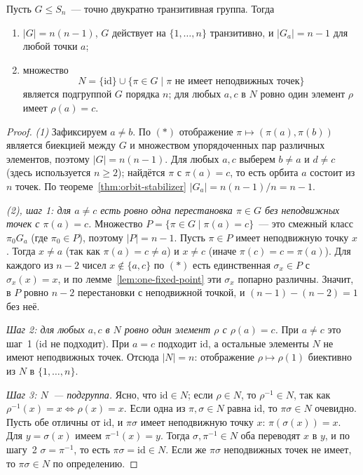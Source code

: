 \documentclass[12pt]{article}
\begin{document}
	\begin{theorem}\label{thm:sharply-2-transitive}
		Пусть $G \leqslant S_n$~--- точно двукратно транзитивная группа. Тогда
		\begin{enumerate}
			\item $|G| = n(n - 1)$, $G$ действует на $\{1, \dots, n\}$ транзитивно, и $|G_a| = n - 1$ для любой точки $a$;
			\item множество
			\[
				N = \{ \mathrm{id} \} \cup \{ \pi \in G \mid \pi \text{ не имеет неподвижных точек} \}
			\]
			является подгруппой $G$ порядка $n$; для любых $a, c$ в $N$ ровно один элемент $\rho$ имеет $\rho(a) = c$.
		\end{enumerate}
	\end{theorem}

	\begin{proof}
		\emph{(1)} Зафиксируем $a \ne b$. По $(\ast)$ отображение $\pi \mapsto (\pi(a), \pi(b))$ является биекцией между $G$ и множеством упорядоченных пар различных элементов, поэтому $|G| = n(n - 1)$. Для любых $a, c$ выберем $b \ne a$ и $d \ne c$ (здесь используется $n \geqslant 2$); найдётся $\pi$ с $\pi(a) = c$, то есть орбита $a$ состоит из $n$ точек. По теореме~\ref{thm:orbit-stabilizer} $|G_a| = n(n - 1)/n = n - 1$.

		\emph{(2), шаг 1: для $a \ne c$ есть ровно одна перестановка $\pi \in G$ без неподвижных точек с $\pi(a) = c$.}
		Множество $P = \{ \pi \in G \mid \pi(a) = c \}$~--- это смежный класс $\pi_0G_a$ (где $\pi_0 \in P$), поэтому $|P| = n - 1$. Пусть $\pi \in P$ имеет неподвижную точку $x$. Тогда $x \ne a$ (так как $\pi(a) = c \ne a$) и $x \ne c$ (иначе $\pi(c) = c = \pi(a)$). Для каждого из $n - 2$ чисел $x \notin \{a, c\}$ по $(\ast)$ есть единственная $\sigma_x \in P$ с $\sigma_x(x) = x$, и по лемме~\ref{lem:one-fixed-point} эти $\sigma_x$ попарно различны. Значит, в $P$ ровно $n - 2$ перестановки с неподвижной точкой, и $(n - 1) - (n - 2) = 1$ без неё.

		\emph{Шаг 2: для любых $a, c$ в $N$ ровно один элемент $\rho$ с $\rho(a) = c$.}
		При $a \ne c$ это шаг~1 ($\mathrm{id}$ не подходит). При $a = c$ подходит $\mathrm{id}$, а остальные элементы $N$ не имеют неподвижных точек. Отсюда $|N| = n$: отображение $\rho \mapsto \rho(1)$ биективно из $N$ в $\{1, \dots, n\}$.

		\emph{Шаг 3: $N$~--- подгруппа.} Ясно, что $\mathrm{id} \in N$; если $\rho \in N$, то $\rho^{-1} \in N$, так как $\rho^{-1}(x) = x \iff \rho(x) = x$. Если одна из $\pi, \sigma \in N$ равна $\mathrm{id}$, то $\pi\sigma \in N$ очевидно. Пусть обе отличны от $\mathrm{id}$, и $\pi\sigma$ имеет неподвижную точку $x$: $\pi(\sigma(x)) = x$. Для $y = \sigma(x)$ имеем $\pi^{-1}(x) = y$. Тогда $\sigma, \pi^{-1} \in N$ оба переводят $x$ в $y$, и по шагу~2 $\sigma = \pi^{-1}$, то есть $\pi\sigma = \mathrm{id} \in N$. Если же $\pi\sigma$ неподвижных точек не имеет, то $\pi\sigma \in N$ по определению.
	\end{proof}
\end{document}

